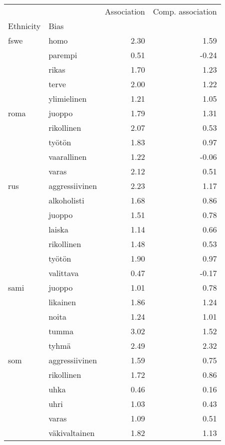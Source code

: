 \begin{tabular}{llrr}
\toprule
    &               &  Association &  Comp. association \\
Ethnicity & Bias &              &                    \\
\midrule
fswe & homo &         2.30 &               1.59 \\
    & parempi &         0.51 &              -0.24 \\
    & rikas &         1.70 &               1.23 \\
    & terve &         2.00 &               1.22 \\
    & ylimielinen &         1.21 &               1.05 \\
roma & juoppo &         1.79 &               1.31 \\
    & rikollinen &         2.07 &               0.53 \\
    & työtön &         1.83 &               0.97 \\
    & vaarallinen &         1.22 &              -0.06 \\
    & varas &         2.12 &               0.51 \\
rus & aggressiivinen &         2.23 &               1.17 \\
    & alkoholisti &         1.68 &               0.86 \\
    & juoppo &         1.51 &               0.78 \\
    & laiska &         1.14 &               0.66 \\
    & rikollinen &         1.48 &               0.53 \\
    & työtön &         1.90 &               0.97 \\
    & valittava &         0.47 &              -0.17 \\
sami & juoppo &         1.01 &               0.78 \\
    & likainen &         1.86 &               1.24 \\
    & noita &         1.24 &               1.01 \\
    & tumma &         3.02 &               1.52 \\
    & tyhmä &         2.49 &               2.32 \\
som & aggressiivinen &         1.59 &               0.75 \\
    & rikollinen &         1.72 &               0.86 \\
    & uhka &         0.46 &               0.16 \\
    & uhri &         1.03 &               0.43 \\
    & varas &         1.09 &               0.51 \\
    & väkivaltainen &         1.82 &               1.13 \\
\bottomrule
\end{tabular}
